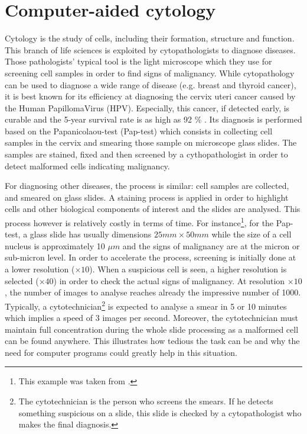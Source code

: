 \section{Computer-aided cytology}
\label{sec:cadc}
Cytology is the study of cells, including their formation, structure and function. This branch of life sciences is exploited by cytopathologists to diagnose diseases. Those pathologists' typical tool is the light microscope which they use for screening cell samples in order to find signs of malignancy. While cytopathology can be used to diagnose a wide range of disease (e.g. breast and thyroid cancer), it is best known for its efficiency at diagnosing the cervix uteri cancer caused by the Human PapillomaVirus (HPV). Especially, this cancer, if detected early, is curable and the 5-year survival rate is as high as 92 \% \cite{bengtsson2014screening}. Its diagnosis is performed based on the Papanicolaou-test (Pap-test) which consists in collecting cell samples in the cervix and smearing those sample on microscope glass slides. The samples are stained, fixed and then screened by a cythopathologist in order to detect malformed cells indicating malignancy. 

For diagnosing other diseases, the process is similar: cell samples are collected, and smeared on glass slides. A staining process is applied in order to highlight cells and other biological components of interest and the slides are analysed. This process however is relatively costly in terms of time. For instance\footnote{This example was taken from \cite{bengtsson2014screening}.}, for the Pap-test, a glass slide has usually dimensions $25mm \times 50mm$ while the size of a cell nucleus is approximately 10 $\mu m$ and the signs of malignancy are at the micron or sub-micron level. In order to accelerate the process, screening is initially done at a lower resolution ($\times 10$). When a suspicious cell is seen, a higher resolution is selected ($\times 40$) in order to check the actual signs of malignancy. 
At resolution $\times 10$, the number of images to analyse reaches already the impressive number of 1000. Typically, a cytotechnician\footnote{The cytotechnician is the person who screens the smears. If he detects something suspicious on a slide, this slide is checked by a cytopathologist who makes the final diagnosis.} is expected to analyse a smear in 5 or 10 minutes which implies a speed of 3 images per second. Moreover, the cytotechnician must maintain full concentration during the whole slide processing as a malformed cell can be found anywhere. This illustrates how tedious the task can be and why the need for computer programs could greatly help in this situation. 

